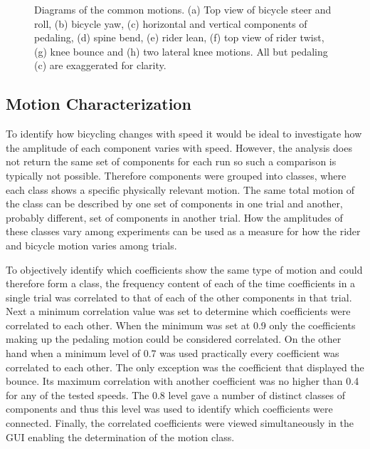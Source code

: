 \documentclass[smallextended]{svjour3}     %
\begin{document}
\begin{figure}[tbp]
    \begin{center}
        \qquad
        \qquad
        \qquad

        \qquad
        \qquad
        \qquad
    \end{center}
    \caption{Diagrams of the common motions. (a) Top view of bicycle steer
    and roll, (b) bicycle yaw, (c) horizontal and vertical components
    of pedaling, (d) spine bend, (e) rider lean, (f) top view of rider
    twist, (g) knee bounce and (h) two lateral knee motions. All but pedaling (c) are
    exaggerated for clarity.}
    \label{fig:motions}
\end{figure}

\subsection{Motion Characterization}
\label{sec:motionChar}
To identify how bicycling changes with speed it would be ideal to investigate
how the amplitude of each component varies with speed. However, the analysis
does not return the same set of components for each run so such a comparison is
typically not possible. Therefore components were grouped into classes, where
each class shows a specific physically relevant motion. The same total motion
of the class can be described by one set of components in one trial and
another, probably different, set of components in another trial. How the
amplitudes of these classes vary among experiments can be used as a
measure for how the rider and bicycle motion varies among trials.

To objectively identify which coefficients show the same type of motion and
could therefore form a class, the frequency content of each of the time
coefficients in a single trial was correlated to that of each of the other
components in that trial. Next a minimum correlation value was set to determine
which coefficients were correlated to each other. When the minimum was set at
0.9 only the coefficients making up the pedaling motion could be considered
correlated. On the other hand when a minimum level of 0.7 was used practically
every coefficient was correlated to each other. The only exception was the
coefficient that displayed the bounce. Its maximum correlation with another
coefficient was no higher than 0.4 for any of the tested speeds. The 0.8 level
gave a number of distinct classes of components and thus this level was used to
identify which coefficients were connected. Finally, the correlated
coefficients were viewed simultaneously in the GUI enabling the determination
of the motion class.
\end{document}
